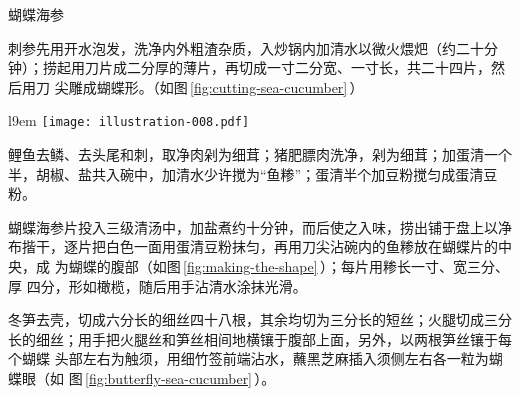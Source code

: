 \begin{recipe}{蝴蝶海参}

\ingredients


\preparation

\step 刺参先用开水泡发，洗净内外粗渣杂质，入炒锅内加清水以微火煨𤆵（约二十分
钟）；捞起用刀片成二分厚的薄片，再切成一寸二分宽、一寸长，共二十四片，然后用刀
尖雕成蝴蝶形。（如图\,\ref{fig:cutting-sea-cucumber}\,）

\begin{wrapfigure}[7]{l}{9em}%
\centering%
\vspace{-.6875\baselineskip}%
\texttt{[image: illustration-008.pdf]}%
\vspace{-.1875\baselineskip}%
\caption{用海参雕成的蝴蝶形}%
\label{fig:cutting-sea-cucumber}%
\end{wrapfigure}

\step 鲤鱼去鳞、去头尾和刺，取净肉剁为细茸；猪肥膘肉洗净，剁为细茸；加蛋清一个
半，胡椒、盐共入碗中，加清水少许搅为“鱼糁”；蛋清半个加豆粉搅匀成蛋清豆粉。

\step 蝴蝶海参片投入三级清汤中，加盐煮约十分钟，而后使之入味，捞出铺于盘上以净
布揩干，逐片把白色一面用蛋清豆粉抹匀，再用刀尖沾碗内的鱼糁放在蝴蝶片的中央，成
为蝴蝶的腹部（如图\,\ref{fig:making-the-shape}\,）；每片用糁长一寸、宽三分、厚
四分，形如橄榄，随后用手沾清水涂抹光滑。

\step 冬笋去壳，切成六分长的细丝四十八根，其余均切为三分长的短丝；火腿切成三分
长的细丝；用手把火腿丝和笋丝相间地横镶于腹部上面，另外，以两根笋丝镶于每个蝴蝶
头部左右为触须，用细竹签前端沾水，蘸黑芝麻插入须侧左右各一粒为蝴蝶眼（如
图\,\ref{fig:butterfly-sea-cucumber}\,）。


\end{recipe}
